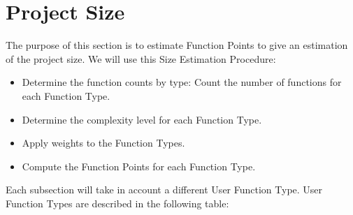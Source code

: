 \documentclass[../../../../projectPlan.tex]{subfiles}
\begin{document}
	\section{Project Size}

		The purpose of this section is to estimate Function Points to give an estimation of the project size.
		We will use this Size Estimation Procedure:

		\begin{itemize}
			\item Determine the function counts by type: Count the number of functions for each Function Type.
			\item Determine the complexity level for each Function Type.
			\item Apply weights to the Function Types.
			\item Compute the Function Points for each Function Type.
		\end{itemize}
		
		Each subsection will take in account a different User Function Type. User Function Types are described in the following table:
\end{document}
